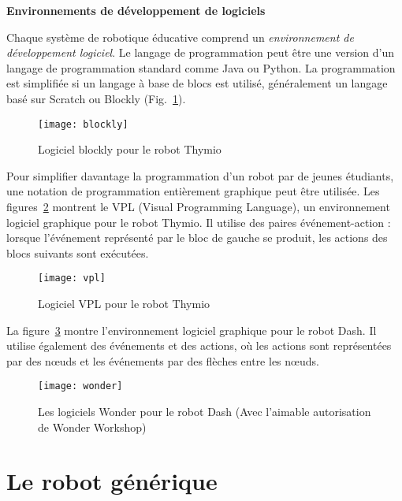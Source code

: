 {\medskip

\noindent\textbf{Environnements de développement de logiciels}

Chaque système de robotique éducative comprend un \emph{environnement de développement logiciel}. Le langage de programmation peut être une version d'un langage de programmation standard comme Java ou Python. La programmation est simplifiée si un langage à base de blocs est utilisé, généralement un langage basé sur Scratch ou Blockly (Fig.~\ref{fig.ide-blocks}).

\begin{figure}
\begin{center}
\texttt{[image: blockly]}
\end{center}
\caption{Logiciel blockly pour le robot Thymio}\label{fig.ide-blocks}
\end{figure}

Pour simplifier davantage la programmation d'un robot par de jeunes étudiants, une notation de programmation entièrement graphique peut être utilisée. Les figures~\ref{fig.ide-thymio} montrent le VPL (Visual Programming Language), un environnement logiciel graphique pour le robot Thymio. Il utilise des paires événement-action : lorsque l'événement représenté par le bloc de gauche se produit, les actions des blocs suivants sont exécutées.

\begin{figure}
\begin{center}
\texttt{[image: vpl]}
\end{center}
\caption{Logiciel VPL pour le robot Thymio}\label{fig.ide-thymio}
\end{figure}

La figure~\ref{fig.ide-dash} montre l'environnement logiciel graphique pour le robot Dash. Il utilise également des événements et des actions, où les actions sont représentées par des nœuds et les événements par des flèches entre les nœuds.

\begin{figure}
\begin{center}
\texttt{[image: wonder]}
\end{center}
\caption{Les logiciels Wonder pour le robot Dash (Avec l'aimable autorisation de Wonder Workshop)}\label{fig.ide-dash}
\end{figure}

\section{Le robot générique}\label{s.generic}

}
